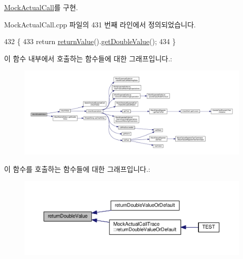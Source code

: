 \hyperlink{class_mock_actual_call_ae79064510b836c4d32fdc1c1656f23b8}{Mock\+Actual\+Call}를 구현.



Mock\+Actual\+Call.\+cpp 파일의 431 번째 라인에서 정의되었습니다.


\begin{DoxyCode}
432 \{
433     \textcolor{keywordflow}{return} \hyperlink{class_mock_checked_actual_call_a97defb904464d58fdd3e1c8f1d937fc6}{returnValue}().\hyperlink{class_mock_named_value_acafefa2f258c976d04f0cd78e2a6ad2c}{getDoubleValue}();
434 \}
\end{DoxyCode}


이 함수 내부에서 호출하는 함수들에 대한 그래프입니다.\+:
\nopagebreak
\begin{figure}[H]
\begin{center}
\leavevmode
\includegraphics[width=350pt]{class_mock_checked_actual_call_a92e3571079d06427fff18c118ccb352b_cgraph}
\end{center}
\end{figure}




이 함수를 호출하는 함수들에 대한 그래프입니다.\+:
\nopagebreak
\begin{figure}[H]
\begin{center}
\leavevmode
\includegraphics[width=350pt]{class_mock_checked_actual_call_a92e3571079d06427fff18c118ccb352b_icgraph}
\end{center}
\end{figure}


